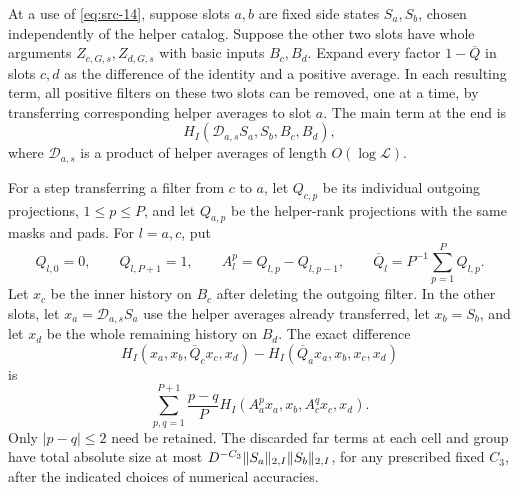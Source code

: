 \begin{lemma}
\label{lem:transfer}
At a use of \eqref{eq:src-14}, suppose slots $a,b$ are fixed side states
$S_a,S_b$, chosen independently of the helper catalog.  Suppose the
other two slots have whole arguments $Z_{c,G,s},Z_{d,G,s}$ with basic
inputs $B_c,B_d$.  Expand every factor $1-\overline Q$ in slots $c,d$
as the difference of the identity and a positive average.  In each
resulting term, all positive filters on these two slots can be removed,
one at a time, by transferring corresponding helper averages to slot $a$.
The main term at the end is
\[
 H_I(\mathcal D_{a,s}S_a,S_b,B_c,B_d),
\]
where $\mathcal D_{a,s}$ is a product of helper averages of length
$O(\log\mathcal L)$.

For a step transferring a filter from $c$ to $a$, let $Q_{c,p}$ be
its individual outgoing projections, $1\le p\le P$, and let $Q_{a,p}$
be the helper-rank projections with the same masks and pads.
For $l=a,c$, put
\[
 Q_{l,0}=0,\qquad Q_{l,P+1}=1,\qquad
 A_l^p=Q_{l,p}-Q_{l,p-1},\qquad
 \overline Q_l=P^{-1}\sum_{p=1}^P Q_{l,p}.
\]
Let $x_c$ be the inner history on $B_c$ after deleting the outgoing
filter.  In the other slots, let $x_a=\mathcal D_{a,s}S_a$ use the helper
averages already transferred, let $x_b=S_b$, and let $x_d$ be the
whole remaining history on $B_d$.  The exact difference
\[
 H_I(x_a,x_b,\overline Q_c x_c,x_d)
 -H_I(\overline Q_a x_a,x_b,x_c,x_d)
\]
is
\begin{equation*}
 \sum_{p,q=1}^{P+1}\frac{p-q}{P}
 H_I(A_a^p x_a,x_b,A_c^q x_c,x_d).
 \tag{15}\label{eq:src-15}
\end{equation*}
Only $|p-q|\le2$ need be retained.  The discarded far terms at each
cell and group have total absolute size at most
$D^{-C_3}\lVert S_a\rVert_{2,I}\lVert S_b\rVert_{2,I}$, for any prescribed fixed
$C_3$, after the indicated choices of numerical accuracies.
\end{lemma}

